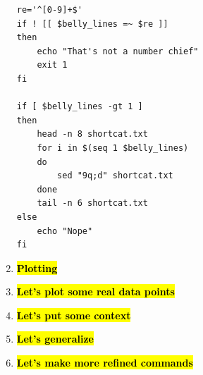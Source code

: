 \documentclass[9pt]{article}
\begin{document}
\begin{enumerate}
\begin{lstlisting}
re='^[0-9]+$'
if ! [[ $belly_lines =~ $re ]] 
then
    echo "That's not a number chief"
    exit 1
fi

if [ $belly_lines -gt 1 ]
then
    head -n 8 shortcat.txt
    for i in $(seq 1 $belly_lines)
    do 
        sed "9q;d" shortcat.txt
    done
    tail -n 6 shortcat.txt
else
    echo "Nope"
fi
		\end{lstlisting}


	\item \hl{\textbf{Plotting}}
	\item \hl{\textbf{Let's plot some real data points}}
	\item \hl{\textbf{Let's put some context}}
	\item \hl{\textbf{Let's generalize}}
	\item \hl{\textbf{Let's make more refined commands}}
	
\end{enumerate}
\end{document}
